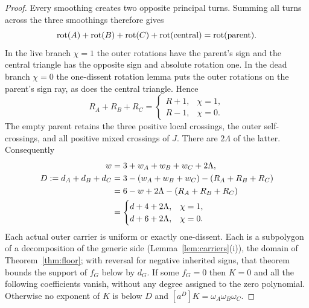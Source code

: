 \begin{proof}
Every smoothing creates two opposite principal turns. Summing all
turns across the three smoothings therefore gives
\[
 \operatorname{rot}(A)+\operatorname{rot}(B)+\operatorname{rot}(C)+\operatorname{rot}(\text{central})
       =\operatorname{rot}(\text{parent}).
\]
In the live branch $\chi=1$ the outer rotations have the parent's
sign and the central triangle has the opposite sign and absolute
rotation one. In the dead branch $\chi=0$ the one-dissent rotation
lemma puts the outer rotations on the parent's sign ray, as does
the central triangle. Hence
\begin{equation}\label{rtr:extreme-rotations}
 R_A+R_B+R_C=
 \begin{cases}R+1,&\chi=1,\\ R-1,&\chi=0.\end{cases}
\end{equation}
The empty parent retains the three positive local crossings, the
outer self-crossings, and all positive mixed crossings of $J$.
There are $2\Lambda$ of the latter. Consequently
\begin{align}
 w&=3+w_A+w_B+w_C+2\Lambda,\notag\\
 D:=d_A+d_B+d_C
   &=3-(w_A+w_B+w_C)-(R_A+R_B+R_C)\notag\\
   &=6-w+2\Lambda-(R_A+R_B+R_C)\notag\\
   &=\begin{cases}d+4+2\Lambda,&\chi=1,\\
                    d+6+2\Lambda,&\chi=0.
      \end{cases}\label{rtr:extreme-slots}
\end{align}
Each actual outer carrier is uniform or exactly one-dissent. Each
is a subpolygon of a decomposition of the generic side
(Lemma~\ref{lem:carriers}(i)), the domain of Theorem~\ref{thm:floor}; with
reversal for negative inherited signs, that theorem bounds the support of
$f_G$ below by $d_G$. If some $f_G=0$
then $K=0$ and all the following coefficients vanish, without any
degree assigned to the zero polynomial. Otherwise no exponent of
$K$ is below $D$ and
$[a^D]K=\omega_A\omega_B\omega_C$.


\end{proof}
